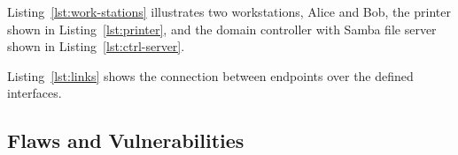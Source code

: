 Listing~\ref{lst:work-stations} illustrates two workstations, Alice and Bob, the printer shown in Listing~\ref{lst:printer}, and the domain controller with Samba file server shown in Listing~\ref{lst:ctrl-server}.


Listing~\ref{lst:links} shows the connection between endpoints over the defined interfaces.

\subsection{Flaws and Vulnerabilities}\label{subsec:flaws-and-vulnerabilities}



